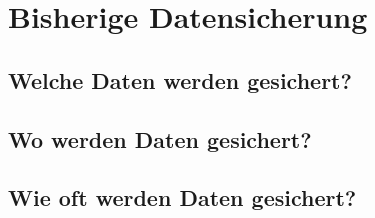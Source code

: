 \chapter{Bisherige Datensicherung}
\section{Welche Daten werden gesichert?}
\section{Wo werden Daten gesichert?}
\section{Wie oft werden Daten gesichert?}
